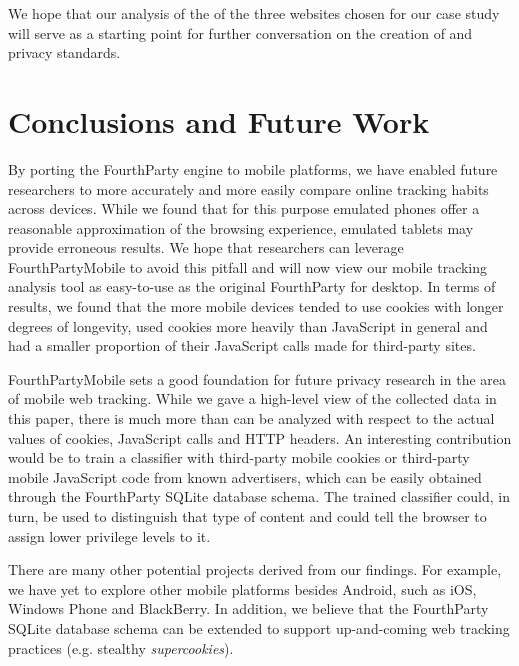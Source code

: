 \documentclass{acm_proc_article-sp}
\begin{document}
We hope that our analysis of the \pps of the three websites chosen for our case study will serve as a starting point for further conversation on the creation of \pps and privacy standards.

\section{Conclusions and Future Work}

By porting the FourthParty engine to mobile platforms, we have enabled future researchers to more accurately and more easily compare online tracking habits across devices. While we found that for this purpose emulated phones offer a reasonable approximation of the browsing experience, emulated tablets may provide erroneous results. We hope that researchers can leverage FourthPartyMobile to avoid this pitfall and will now view our mobile tracking analysis tool as easy-to-use as the original FourthParty for desktop. In terms of results, we found that the more mobile devices tended to use cookies with longer degrees of longevity, used cookies more heavily than JavaScript in general and had a smaller proportion of their JavaScript calls made for third-party sites.

FourthPartyMobile sets a good foundation for future privacy research in the area of mobile web tracking. While we gave a high-level view of the collected data in this paper, there is much more than can be analyzed with respect to the actual values of cookies, JavaScript calls and HTTP headers. An interesting contribution would be to train a classifier with third-party mobile cookies or third-party mobile JavaScript code from known advertisers, which can be easily obtained through the FourthParty SQLite database schema. The trained classifier could, in turn, be used to distinguish that type of content and could tell the browser to assign lower privilege levels to it.

There are many other potential projects derived from our findings. For example, we have yet to explore other mobile platforms besides Android, such as iOS, Windows Phone and BlackBerry. In addition, we believe that the FourthParty SQLite database schema can be extended to support up-and-coming web tracking practices (e.g. stealthy \emph{supercookies}\cite{supercookies}).

\nocite{*}


\end{document}
